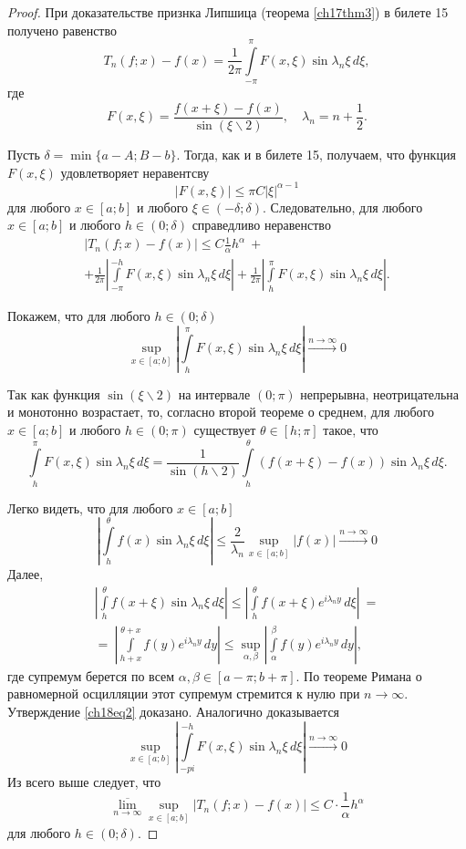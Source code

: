 \begin{proof}
При доказательстве признка Липшица (теорема \ref{ch17thm3}) в билете 15 получено равенство
$$
T_n(f; x) - f(x) = \frac{1}{2\pi} \int\limits_{-\pi}^{\pi} F(x,\xi) \sin{\lambda_n \xi} \,d\xi,
$$
где
$$
F(x,\xi) = \frac{f(x+\xi) - f(x)}{\sin (\xi \backslash 2)}, \quad \lambda_{n} = n + \frac12.
$$

Пусть $\delta = \min \{a - A;B - b\}$. Тогда, как и в билете 15, получаем, что функция $F(x,\xi)$ удовлетворяет неравентсву
$$
|F(x,\xi)| \le \pi C |\xi|^{\alpha - 1}
$$
для любого $x \in [a;b]$ и любого $\xi \in (-\delta;\delta)$. Следовательно, для любого $x \in [a;b]$ и любого $h \in (0;\delta)$ справедливо неравенство
\begin{multline} \label{ch18eq1}
|T_n(f; x) - f(x)| \le C \frac{1}{\alpha} h^{\alpha}\ +\\
+ \frac{1}{2\pi} \left| \int\limits_{-\pi}^{-h} F(x,\xi) \sin{\lambda_n \xi} \,d\xi \right| + \frac{1}{2\pi} \left| \int\limits_{h}^{\pi} F(x,\xi) \sin{\lambda_n \xi} \,d\xi \right|.
\end{multline}

Покажем, что для любого $h \in (0;\delta)$
\begin{equation} \label{ch18eq2}
\sup\limits_{x \in [a;b]}\left|\int\limits_{h}^{\pi} F(x,\xi) \sin{\lambda_n \xi} \,d\xi \right| \xrightarrow{n \to \infty} 0
\end{equation}

Так как функция $\sin (\xi \backslash 2)$ на интервале $(0;\pi)$ непрерывна, неотрицательна и монотонно возрастает, то, согласно второй теореме о среднем, для любого $x \in [a;b]$ и любого $h \in (0;\pi)$ существует $\theta \in [h;\pi]$ такое, что
$$
\int\limits_{h}^{\pi} F(x,\xi) \sin{\lambda_n \xi}\,d\xi = \frac{1}{\sin (h \backslash 2)} \int\limits_{h}^{\theta} (f(x+\xi) - f(x)) \sin{\lambda_n \xi}\,d\xi.
$$

Легко видеть, что для любого $x \in [a;b]$
$$
\left| \int\limits_{h}^{\theta} f(x) \sin{\lambda_n \xi}\,d\xi \right| \le \frac{2}{\lambda_{n}}\sup\limits_{x \in [a;b]}|f(x)| \xrightarrow{n \to \infty} 0
$$
Далее,
\begin{multline*}
\left| \int\limits_{h}^{\theta} f(x + \xi) \sin{\lambda_n \xi}\,d\xi \right| \le \left| \int\limits_{h}^{\theta} f(x + \xi) e^{i\lambda_{n}y} \,d\xi \right|\ =\\
=\ \left| \int\limits_{h + x}^{\theta + x} f(y) e^{i\lambda_{n}y}\,dy \right| \le \sup\limits_{\alpha,\beta} \left|\int\limits_{\alpha}^{\beta} f(y) e^{i\lambda_{n}y}\,dy \right|,
\end{multline*}
где супремум берется по всем $\alpha,\beta \in [a - \pi;b + \pi]$. По теореме Римана о равномерной осцилляции этот супремум стремится к нулю при $n \to \infty$. Утверждение \eqref{ch18eq2} доказано. Аналогично доказывается
\begin{equation} \label{ch18eq3}
\sup\limits_{x \in [a;b]} \left|\int\limits_{-pi}^{-h} F(x,\xi) \sin{\lambda_n \xi} \,d\xi \right| \xrightarrow{n \to \infty} 0
\end{equation}
Из всего выше следует, что
$$
\overline{\lim\limits_{n \to \infty}} \sup \limits_{x \in [a;b]} |T_n(f; x) - f(x)| \le C \cdot \frac{1}{\alpha}h^{\alpha}
$$
для любого $h \in (0;\delta)$.
\end{proof}
